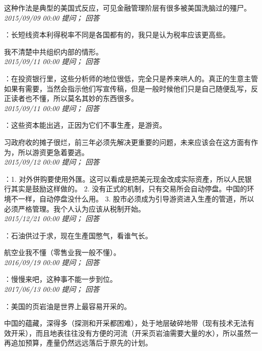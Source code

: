 \documentclass[twocolumn]{ctexart}
\begin{document}
这种作法是典型的美国式反应，可见金融管理阶层有很多被美国洗脑过的殭尸。\\

\textit{\hfill\noindent\small 2015/09/09 00:00 提问； 回答}

：长短线资本利得税率不同是各国都有的，我只是认为税率应该更高些。

我不清楚中共组织内部的情形。\\

\textit{\hfill\noindent\small 2015/09/11 00:00 提问； 回答}

：在投资银行里，这些分析师的地位很低，完全只是养来哄人的。真正的生意主管如果有需要，当然会指示他们写宣传稿，但是一般时候他们只是自己随便乱写，反正读者也不懂，所以莫名其妙的东西很多。\\

\textit{\hfill\noindent\small 2015/09/11 00:00 提问； 回答}

：这些资本能出逃，正因为它们不事生產，是游资。

习政府收的摊子很烂，前三年必须先解决更重要的问题，未来应该会在这方面有作为，所以游资更急着要逃。\\

\textit{\hfill\noindent\small 2015/09/12 00:00 提问； 回答}

：1. 对外併购要使用外匯。这可以看成是把美元现金改成实际资產，所以人民银行其实是鼓励这样做的。
2. 没有正式的机制，只有交易所会自动停盘。中国的环境不一样，自动停盘没什么用。
3. 股市必须成为引导游资进入生產的管道，所以必须严格管理。我个人认为应该从税制开始。\\

\textit{\hfill\noindent\small 2015/12/21 00:00 提问； 回答}

：石油供过于求，现在生產国憋气，看谁气长。

航空业我不懂（零售业我一般不懂）。\\

\textit{\hfill\noindent\small 2016/09/19 00:00 提问； 回答}

：慢慢来吧，这种事不能一步到位。\\

\textit{\hfill\noindent\small 2017/06/13 00:00 提问； 回答}

：美国的页岩油是世界上最容易开采的。

中国的蕴藏，深得多（探测和开采都困难），处于地层破碎地带（现有技术无法有效开采），而且地表往往没有方便的河流（开采页岩油需要大量的水），所以虽然一再追加预算，產量仍然远远落后于原先的计划。\\
\end{document}
